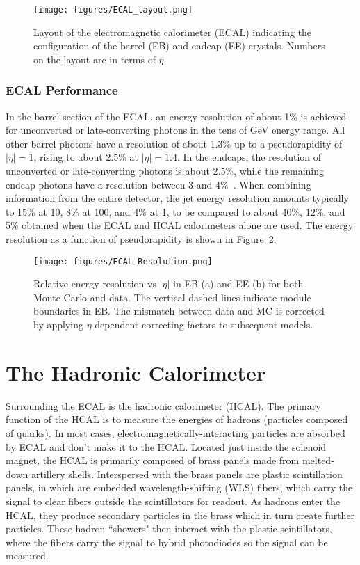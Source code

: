 \begin{figure}\centering
  \texttt{[image: figures/ECAL\_layout.png]}
  \caption{\label{fig:ECAL_layout} Layout of the electromagnetic calorimeter (ECAL) indicating the configuration of the barrel (EB) and endcap (EE) crystals. Numbers on the layout are in terms of $\eta$.}
\end{figure}

\subsubsection{ECAL Performance}

In the barrel section of the ECAL, an energy resolution of about 1\% is achieved for unconverted or late-converting photons in the tens of GeV energy range. All other barrel photons have a resolution of about 1.3\% up to a pseudorapidity of $|\eta| = 1$, rising to about 2.5\% at $|\eta| = 1.4$. In the endcaps, the resolution of unconverted or late-converting photons is about 2.5\%, while the remaining endcap photons have a resolution between 3 and 4\%~\cite{CMS:EGM-14-001}. When combining information from the entire detector, the jet energy resolution amounts typically to 15\% at 10\GeV, 8\% at 100\GeV, and 4\% at 1\TeV, to be compared to about 40\%, 12\%, and 5\% obtained when the ECAL and HCAL calorimeters alone are used. The energy resolution as a function of pseudorapidity is shown in Figure~\ref{fig:ECAL_Resolution}\cite{ECAL}.

\begin{figure}\centering
  \texttt{[image: figures/ECAL\_Resolution.png]}
  \caption{\label{fig:ECAL_Resolution} Relative energy resolution vs $|\eta|$ in EB (a) and EE (b) for both Monte Carlo and data. The vertical dashed lines indicate module boundaries in EB. The mismatch between data and MC is corrected by applying $\eta$-dependent correcting factors to subsequent models.}
\end{figure}





\section{The Hadronic Calorimeter}

Surrounding the ECAL is the hadronic calorimeter (HCAL). The primary function of the HCAL is to measure the energies of hadrons (particles composed of quarks). In most cases, electromagnetically-interacting particles are absorbed by ECAL and don't make it to the HCAL. Located just inside the solenoid magnet, the HCAL is primarily composed of brass panels made from melted-down artillery shells. Interspersed with the brass panels are plastic scintillation panels, in which are embedded wavelength-shifting (WLS) fibers, which carry the signal to clear fibers outside the scintillators for readout. As hadrons enter the HCAL, they produce secondary particles in the brass which in turn create further particles. These hadron ``showers" then interact with the plastic scintillators, where the fibers carry the signal to hybrid photodiodes so the signal can be measured.

